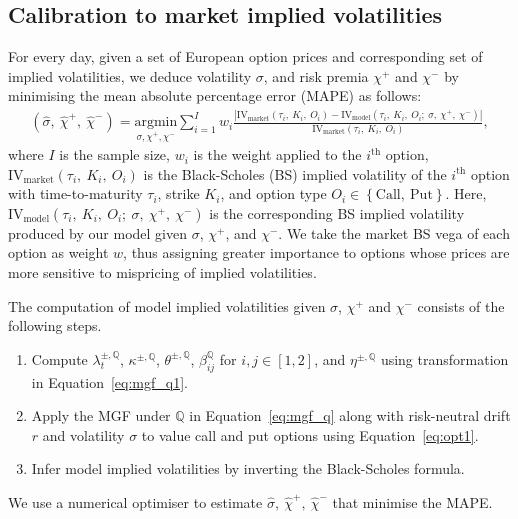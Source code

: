 \documentclass[11pt,a4paper]{article}
\numberwithin{equation}{section}
\theoremstyle{remark}
\theoremstyle{definition}
\begin{document}
\subsection{Calibration to market implied volatilities}\label{sec:second_stage}
For every day, given a set of European option prices and corresponding set of implied volatilities, we deduce volatility $\sigma$, and risk premia $\chi^+$ and $\chi^-$ by minimising the mean absolute percentage error (MAPE) as follows:
 \begin{align*}
  \left(\widehat \sigma,\ \widehat \chi^+,\ \widehat\chi^-\right) = \underset{\sigma,\chi^+,\chi^-} {\text{argmin}}
  \sum_{i=1}^I
  w_i \frac{\left|\text{IV}_{\text{market}}\left(\tau_i,\ K_i,\ O_i\right)-\text{IV}_\text{model}\left(\tau_i,\ K_i,\ O_i;\ \sigma,\ \chi^+,\ \chi^-\right)\right|}{\text{IV}_{\text{market}}\left(\tau_i,\ K_i,\ O_i\right)},
 \end{align*}
 where $I$ is the sample size, $w_i$ is the weight applied to the $i^\text{th}$ option,
 $\text{IV}_\text{market}\left(\tau_i,\ K_i,\ O_i\right)$ is the Black-Scholes (BS) implied volatility of the $i^\text{th}$ option with time-to-maturity $\tau_i$, strike $K_i$, and option type $O_i\in \left\{\text{Call},\ \text{Put}\right\}$. Here,
 $\text{IV}_\text{model}\left(\tau_i,\ K_i,\ O_i;\ \sigma,\ \chi^+,\ \chi^-\right)$ is the corresponding BS implied volatility produced by our model given $\sigma$, $\chi^+$, and $\chi^-$.
 We take the market BS vega of each option as weight $w$, thus assigning greater importance to options whose prices are more sensitive to mispricing of implied volatilities.

The computation of model implied volatilities given $\sigma$, $\chi^+$ and $\chi^-$ consists of the following steps.

\begin{enumerate}
    \item Compute $\lambda^{\pm,\mathbb{Q}}_t$, $\kappa^{\pm, \mathbb{Q}}$, $\theta^{\pm, \mathbb{Q}}$, $\beta_{ij}^\mathbb{Q}$ for $i,j\in [1,2]$, and $\eta^{\pm, \mathbb{Q}}$ using transformation in Equation~\eqref{eq:mgf_q1}.

    \item Apply the MGF under $\mathbb{Q}$ in Equation~\eqref{eq:mgf_q} along with risk-neutral drift $r$ and volatility $\sigma$ to value call and put options using Equation~\eqref{eq:opt1}.
    \item Infer model implied volatilities by inverting the Black-Scholes formula.
\end{enumerate}
We use a numerical optimiser to estimate $\widehat \sigma,\ \widehat \chi^+,\ \widehat\chi^-$ that minimise the MAPE.
\end{document}
